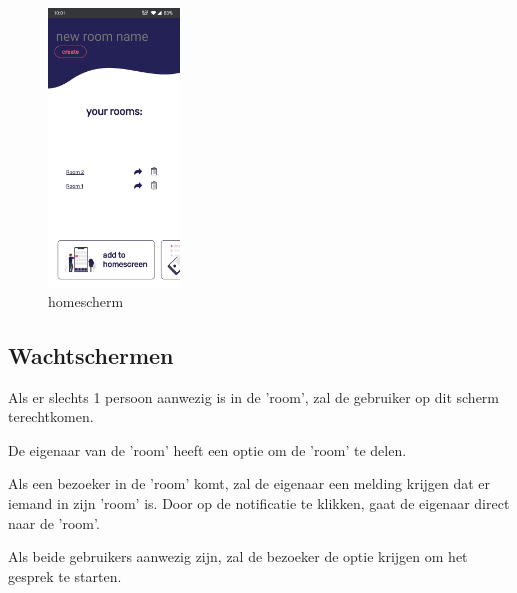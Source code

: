 			\begin{figure}[H]
				\centering
				\includegraphics[width=35mm]{./img/POC/home}{}		
				\caption{homescherm}
			\end{figure}
		
	\subsection{Wachtschermen}
		Als er slechts 1 persoon aanwezig is in de 'room', zal de gebruiker op dit scherm terechtkomen. 
		
		De eigenaar van de 'room' heeft een optie om de 'room' te delen. 
		
		Als een bezoeker in de 'room' komt, zal de eigenaar een melding krijgen dat er iemand in zijn 'room' is. Door op de notificatie te klikken, gaat de eigenaar direct naar de 'room'.
						
		Als beide gebruikers aanwezig zijn, zal de bezoeker de optie krijgen om het gesprek te starten.
		

